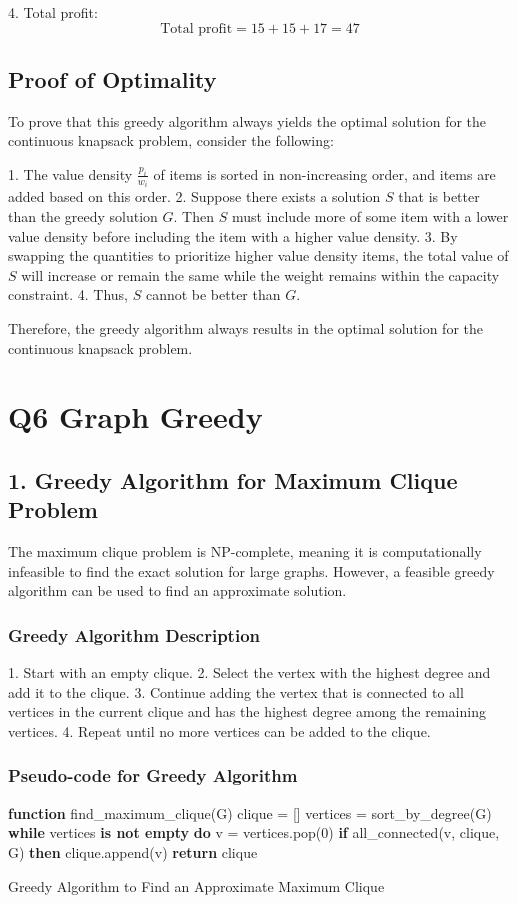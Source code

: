 \documentclass{article}
\begin{document}
4. Total profit:
\[
\text{Total profit} = 15 + 15 + 17 = 47
\]

\subsection*{Proof of Optimality}
To prove that this greedy algorithm always yields the optimal solution for the continuous knapsack problem, consider the following:

1. The value density \(\frac{p_i}{w_i}\) of items is sorted in non-increasing order, and items are added based on this order.
2. Suppose there exists a solution \( S \) that is better than the greedy solution \( G \). Then \( S \) must include more of some item with a lower value density before including the item with a higher value density.
3. By swapping the quantities to prioritize higher value density items, the total value of \( S \) will increase or remain the same while the weight remains within the capacity constraint.
4. Thus, \( S \) cannot be better than \( G \).

Therefore, the greedy algorithm always results in the optimal solution for the continuous knapsack problem.


\section{Q6 Graph Greedy}
\subsection*{1. Greedy Algorithm for Maximum Clique Problem}
The maximum clique problem is NP-complete, meaning it is computationally infeasible to find the exact solution for large graphs. However, a feasible greedy algorithm can be used to find an approximate solution.

\subsubsection*{Greedy Algorithm Description}
1. Start with an empty clique.
2. Select the vertex with the highest degree and add it to the clique.
3. Continue adding the vertex that is connected to all vertices in the current clique and has the highest degree among the remaining vertices.
4. Repeat until no more vertices can be added to the clique.

\subsubsection*{Pseudo-code for Greedy Algorithm}
\begin{algorithm}
\begin{algorithmic}
\State \textbf{function} find\_maximum\_clique(G)
\State \quad clique = []
\State \quad vertices = sort\_by\_degree(G)
\State \quad \textbf{while} vertices \textbf{is not empty} \textbf{do}
\State \quad \quad v = vertices.pop(0)
\State \quad \quad \textbf{if} all\_connected(v, clique, G) \textbf{then}
\State \quad \quad \quad clique.append(v)
\State \quad \textbf{return} clique
\end{algorithmic}
\caption{Greedy Algorithm to Find an Approximate Maximum Clique}
\end{algorithm}
\end{document}
